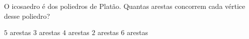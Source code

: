 O icosaedro é dos poliedros de Platão. Quantas arestas concorrem cada vértice desse poliedro?

$5$ arestas
$3$ arestas
$4$ arestas
$2$ arestas
$6$ arestas



